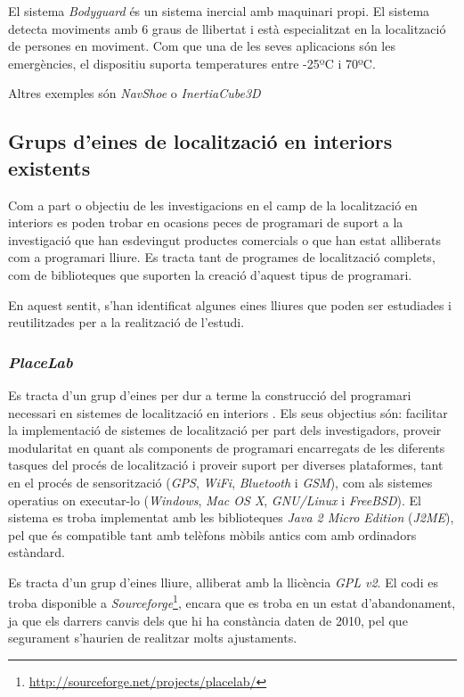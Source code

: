 El sistema \textit{Bodyguard} \cite{koppe} és un sistema inercial amb maquinari propi. El sistema detecta moviments amb 6 graus de llibertat i està especialitzat en la localització de persones en moviment. Com que una de les seves aplicacions són les emergències, el dispositiu suporta temperatures entre -25ºC i 70ºC.

Altres exemples són \textit{NavShoe} \cite{krach} o \textit{InertiaCube3D}


\subsection{Grups d’eines de localització en interiors existents}

Com a part o objectiu de les investigacions en el camp de la localització en interiors es poden trobar en ocasions peces de programari de suport a la investigació que han esdevingut productes comercials o que han estat alliberats com a programari lliure. Es tracta tant de programes de localització complets, com de biblioteques que suporten la creació d'aquest tipus de programari.

En aquest sentit, s'han identificat algunes eines lliures que poden ser estudiades i reutilitzades per a la realització de l'estudi.

\subsubsection{\textit{PlaceLab}}

Es tracta d’un grup d’eines per dur a terme la construcció del programari necessari en sistemes de localització en interiors \cite{sohn}. Els seus objectius són: facilitar la implementació de sistemes de localització per part dels investigadors, proveir modularitat en quant als components de programari encarregats de les diferents tasques del procés de localització i proveir suport per diverses plataformes, tant en el procés de sensorització (\textit{GPS}, \textit{WiFi}, \textit{Bluetooth} i \textit{GSM}), com als sistemes operatius on executar-lo (\textit{Windows}, \textit{Mac OS X}, \textit{GNU/Linux} i \textit{FreeBSD}). El sistema es troba implementat amb les biblioteques \textit{Java 2 Micro Edition} (\textit{J2ME}), pel que és compatible tant amb telèfons mòbils antics com amb ordinadors estàndard.

Es tracta d’un grup d’eines lliure, alliberat amb la llicència \textit{GPL v2}. El codi es troba disponible a \textit{Sourceforge}\footnote{\url{http://sourceforge.net/projects/placelab/}}, encara que es troba en un estat d’abandonament, ja que els darrers canvis dels que hi ha constància daten de 2010, pel que segurament s’haurien de realitzar molts ajustaments.

